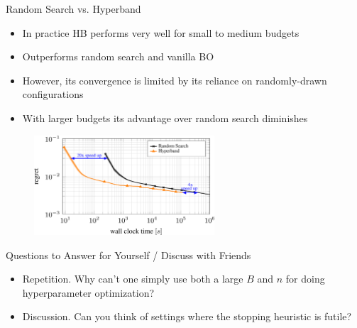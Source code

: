 \begin{frame}{Random Search vs. Hyperband}

\begin{itemize}
    \item In practice HB performs very well for small to medium budgets
    \item Outperforms random search and vanilla BO
    \item However, its convergence is limited by its reliance on randomly-drawn configurations
    \item With larger budgets its advantage over random search diminishes
\end{itemize}
\begin{figure}
    \centering
    \includegraphics[width=0.6\textwidth]{../w07_hpo_speedup/images/hyperband/comparison_rs_hb.png}
\end{figure}


\end{frame}


\begin{frame}{Questions to Answer for Yourself / Discuss with Friends}

\bigskip

\begin{itemize}
    \item \alert{Repetition.} Why can't one simply use both a large $B$ and $n$ for doing hyperparameter optimization?

\medskip
    \item \alert{Discussion.} 
    Can you think of settings where the stopping heuristic is futile?

\end{itemize}

\end{frame}
